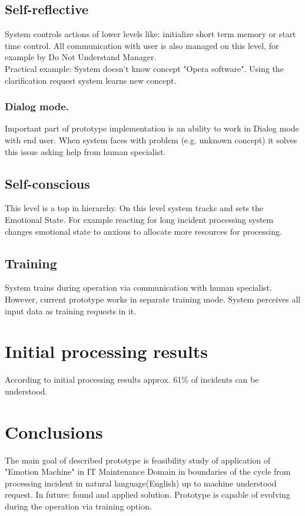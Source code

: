 \documentclass[runningheads,a4paper]{llncs}
\begin{document}
\subsection{Self-reflective}
System controls actions of lower levels like: initialize short term memory or start time control. All communication with user is also managed on this level, for example by Do Not Understand Manager.\\
Practical example: System doesn't know concept "Opera software". Using the clarification request system learns new concept.

\subsubsection{Dialog mode.}
Important part of prototype implementation is an ability to work in Dialog mode with end user. When system faces with problem (e.g. unknown concept) it solves this issue asking help from human specialist.

\subsection{Self-conscious}
This level is a top in hierarchy. On this level system tracks and sets the Emotional State. For example reacting for long incident processing system changes emotional state to anxious to allocate more resources for processing.

\subsection{Training}
System trains during operation via communication with human specialist. However, current prototype works in separate training mode. System perceives all input data as training requests in it.

\section{Initial processing results}

According to initial processing results approx. 61\% of incidents can be understood.

\section{Conclusions}

The main goal of described prototype is feasibility study of application of "Emotion Machine" \cite{mmem} in IT Maintenance Domain in boundaries of the cycle from processing incident in natural language(English) up to machine understood request. In future: found and applied solution. Prototype is capable of evolving during the operation via training option.
\end{document}
